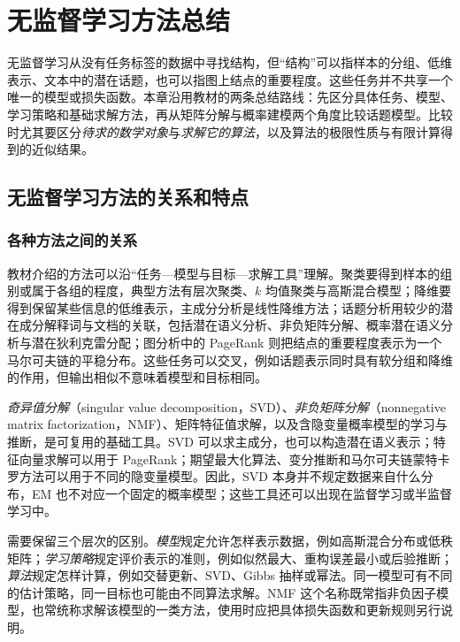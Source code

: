\setcounter{chapter}{20} %
\chapter{无监督学习方法总结}
\label{chap:lh-unsupervised-summary}


无监督学习从没有任务标签的数据中寻找结构，但“结构”可以指样本的分组、低维表示、文本中的潜在话题，也可以指图上结点的重要程度。这些任务并不共享一个唯一的模型或损失函数。本章沿用教材的两条总结路线：先区分具体任务、模型、学习策略和基础求解方法，再从矩阵分解与概率建模两个角度比较话题模型。比较时尤其要区分\emph{待求的数学对象}与\emph{求解它的算法}，以及算法的极限性质与有限计算得到的近似结果。

\section{无监督学习方法的关系和特点}
\label{sec:lh-unsup-relations}

\subsection{各种方法之间的关系}
\label{subsec:lh-unsup-method-relations}

教材介绍的方法可以沿“任务---模型与目标---求解工具”理解。聚类要得到样本的组别或属于各组的程度，典型方法有层次聚类、$k$ 均值聚类与高斯混合模型；降维要得到保留某些信息的低维表示，主成分分析是线性降维方法；话题分析用较少的潜在成分解释词与文档的关联，包括潜在语义分析、非负矩阵分解、概率潜在语义分析与潜在狄利克雷分配；图分析中的 PageRank 则把结点的重要程度表示为一个马尔可夫链的平稳分布。这些任务可以交叉，例如话题表示同时具有软分组和降维的作用，但输出相似不意味着模型和目标相同。

\emph{奇异值分解}（singular value decomposition，SVD）、\emph{非负矩阵分解}（nonnegative matrix factorization，NMF）、矩阵特征值求解，以及含隐变量概率模型的学习与推断，是可复用的基础工具。SVD 可以求主成分，也可以构造潜在语义表示；特征向量求解可以用于 PageRank；期望最大化算法、变分推断和马尔可夫链蒙特卡罗方法可以用于不同的隐变量模型。因此，SVD 本身并不规定数据来自什么分布，EM 也不对应一个固定的概率模型；这些工具还可以出现在监督学习或半监督学习中。

需要保留三个层次的区别。\emph{模型}规定允许怎样表示数据，例如高斯混合分布或低秩矩阵；\emph{学习策略}规定评价表示的准则，例如似然最大、重构误差最小或后验推断；\emph{算法}规定怎样计算，例如交替更新、SVD、Gibbs 抽样或幂法。同一模型可有不同的估计策略，同一目标也可能由不同算法求解。NMF 这个名称既常指非负因子模型，也常统称求解该模型的一类方法，使用时应把具体损失函数和更新规则另行说明。


